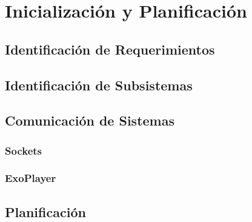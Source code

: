 \chapter{Inicialización y Planificación}

\section{Identificación de Requerimientos}
\section{Identificación de Subsistemas}
\section{Comunicación de Sistemas}
\subsection{Sockets}

\subsection{ExoPlayer}

\section{Planificación}